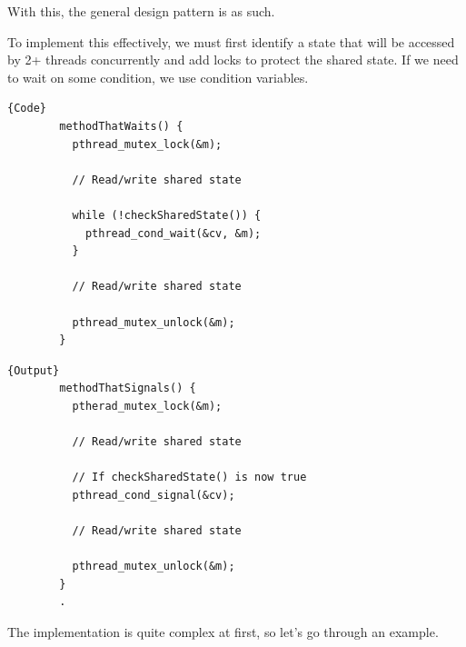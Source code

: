 \documentclass{article}
\begin{document}
    With this, the general design pattern is as such. 

    \begin{theorem}
      To implement this effectively, we must first identify a state that will be accessed by 2+ threads concurrently and add locks to protect the shared state. If we need to wait on some condition, we use condition variables.  

      \noindent\begin{minipage}{.5\textwidth}
      \begin{lstlisting}[]{Code}
        methodThatWaits() {
          pthread_mutex_lock(&m); 

          // Read/write shared state 

          while (!checkSharedState()) {
            pthread_cond_wait(&cv, &m); 
          }

          // Read/write shared state 

          pthread_mutex_unlock(&m); 
        }
      \end{lstlisting}
      \end{minipage}
      \hfill
      \begin{minipage}{.49\textwidth}
      \begin{lstlisting}[]{Output}
        methodThatSignals() {
          ptherad_mutex_lock(&m); 

          // Read/write shared state 

          // If checkSharedState() is now true 
          pthread_cond_signal(&cv); 

          // Read/write shared state 

          pthread_mutex_unlock(&m); 
        }
        .
      \end{lstlisting}
      \end{minipage}
    \end{theorem}

    The implementation is quite complex at first, so let's go through an example. 
\end{document}
